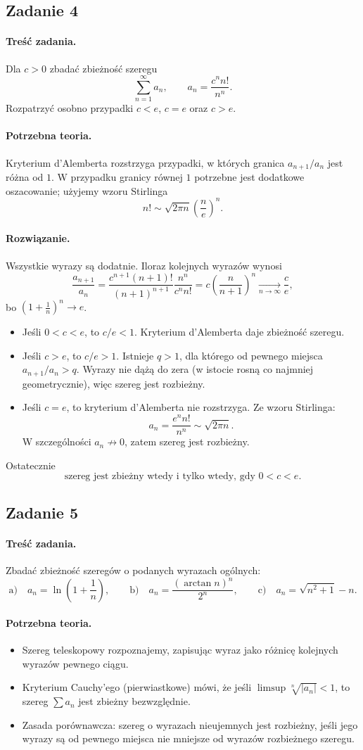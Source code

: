 \documentclass[12pt,a4paper]{article}
\numberwithin{equation}{section}
\newcommand{\zadanie}[1]{\subsection*{Zadanie #1}}
\newcommand{\tresc}{\paragraph{Treść zadania.}}
\newcommand{\teoria}{\paragraph{Potrzebna teoria.}}
\newcommand{\rozw}{\paragraph{Rozwiązanie.}}
\begin{document}
\zadanie{4}
\tresc
Dla \(c>0\) zbadać zbieżność szeregu
\[
  \sum_{n=1}^{\infty}a_n,
  \qquad
  a_n=\frac{c^n n!}{n^n}.
\]
Rozpatrzyć osobno przypadki \(c<e\), \(c=e\) oraz \(c>e\).

\teoria
Kryterium d'Alemberta rozstrzyga przypadki, w których granica
\(a_{n+1}/a_n\) jest różna od \(1\). W przypadku granicy równej \(1\)
potrzebne jest dodatkowe oszacowanie; użyjemy wzoru Stirlinga
\[
  n!\sim \sqrt{2\pi n}\left(\frac{n}{e}\right)^n.
\]

\rozw
Wszystkie wyrazy są dodatnie. Iloraz kolejnych wyrazów wynosi
\[
  \frac{a_{n+1}}{a_n}
  =\frac{c^{n+1}(n+1)!}{(n+1)^{n+1}}
    \frac{n^n}{c^n n!}
  =c\left(\frac{n}{n+1}\right)^n
  \xrightarrow[n\to\infty]{}\frac{c}{e},
\]
bo \(\left(1+\frac1n\right)^n\to e\).
\begin{itemize}
  \item Jeśli \(0<c<e\), to \(c/e<1\). Kryterium d'Alemberta daje
    zbieżność szeregu.
  \item Jeśli \(c>e\), to \(c/e>1\). Istnieje \(q>1\), dla którego
    od pewnego miejsca \(a_{n+1}/a_n>q\). Wyrazy nie dążą do zera
    (w istocie rosną co najmniej geometrycznie), więc szereg jest
    rozbieżny.
  \item Jeśli \(c=e\), to kryterium d'Alemberta nie rozstrzyga.
    Ze wzoru Stirlinga:
    \[
      a_n=\frac{e^n n!}{n^n}
      \sim \sqrt{2\pi n}.
    \]
    W szczególności \(a_n\not\to0\), zatem szereg jest rozbieżny.
\end{itemize}
Ostatecznie
\[
  \boxed{\text{szereg jest zbieżny wtedy i tylko wtedy, gdy }0<c<e.}
\]

\zadanie{5}
\tresc
Zbadać zbieżność szeregów o podanych wyrazach ogólnych:
\[
  \text{a)}\quad a_n=\ln\left(1+\frac1n\right),\qquad
  \text{b)}\quad a_n=\frac{(\arctan n)^n}{2^n},\qquad
  \text{c)}\quad a_n=\sqrt{n^2+1}-n.
\]

\teoria
\begin{itemize}
  \item Szereg teleskopowy rozpoznajemy, zapisując wyraz jako różnicę
    kolejnych wyrazów pewnego ciągu.
  \item Kryterium Cauchy'ego (pierwiastkowe) mówi, że jeśli
    \(\limsup\sqrt[n]{|a_n|}<1\), to szereg \(\sum a_n\) jest
    zbieżny bezwzględnie.
  \item Zasada porównawcza: szereg o wyrazach nieujemnych jest
    rozbieżny, jeśli jego wyrazy są od pewnego miejsca nie mniejsze
    od wyrazów rozbieżnego szeregu.
\end{itemize}
\end{document}

